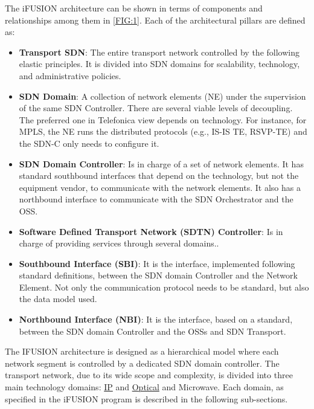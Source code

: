 \documentclass[a4paper,fleqn]{cas-dc}
\begin{document}
The i\uppercase{FUSION} architecture can be shown in terms of components and relationships among them in \cref{FIG:1}. Each of the architectural pillars are defined as:

\begin{itemize}
\item \textbf{Transport SDN}: The entire transport network controlled by the following elastic principles. It is divided into SDN domains for scalability, technology, and administrative policies.

\item \textbf{SDN Domain}: A collection of network elements (NE) under the supervision of the same SDN Controller. There are several viable levels of decoupling. The preferred one in Telefonica view depends on technology. For instance, for MPLS, the NE runs the distributed protocols (e.g., IS-IS TE, RSVP-TE) and the SDN-C only needs to configure it.

\item \textbf{SDN Domain Controller}: Is in charge of a set of network elements. It has standard southbound interfaces that depend on the technology, but not the equipment vendor, to communicate with the network elements. It also has a northbound interface to communicate with the SDN Orchestrator and the OSS.

\item \textbf{Software Defined Transport Network (SDTN) Controller}: Is in charge of providing services through several domains.. 

\item \textbf{Southbound Interface (SBI)}: It is the interface, implemented following standard definitions, between the SDN domain Controller and the Network Element. Not only the communication protocol needs to be standard, but also the data model used.

\item \textbf{Northbound Interface (NBI)}: It is the interface, based on a standard, between the SDN domain Controller and the OSSs and SDN Transport.

\end{itemize}

The \uppercase{iFUSION} architecture is designed as a hierarchical model where each network segment is controlled by a dedicated SDN domain controller. The transport network, due to its wide scope and complexity, is divided into three main technology domains: \hyperref[section:ip]{IP} and \hyperref[section:dwdm]{Optical} and Microwave. Each domain, as specified in the i\uppercase{FUSION} program is described in the following sub-sections.   
\end{document}
